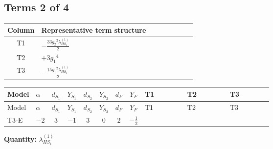 \documentclass[8pt]{article}
\begin{document}
\begin{landscape}
\subsection*{Terms 2 of 4}
\begin{center}
\begin{tabular}{@{}c >{\raggedright\arraybackslash}p{0.82\linewidth}@{}}
\toprule
Column & Representative term structure \\
\midrule
T1 & \(\displaystyle -\frac{33 {g_2}^2 {\lambda_{HS_1}^{(1)}}}{2}\) \\
\midrule
T2 & \(\displaystyle +3 {g_1}^4\) \\
\midrule
T3 & \(\displaystyle -\frac{15 {g_1}^2 {\lambda_{HS_1}^{(1)}}}{2}\) \\
\midrule
\bottomrule
\end{tabular}
\end{center}
\smallskip
\tiny
\begin{longtable}{@{}llcccccc >{\raggedright\arraybackslash}p{0.21\linewidth} >{\raggedright\arraybackslash}p{0.21\linewidth} >{\raggedright\arraybackslash}p{0.21\linewidth}@{}}
\toprule
Model & $\alpha$ & $d_{S_1}$ & $Y_{S_1}$ & $d_{S_2}$ & $Y_{S_2}$ & $d_F$ & $Y_F$ & T1 & T2 & T3 \\
\midrule
\endfirsthead
\toprule
Model & $\alpha$ & $d_{S_1}$ & $Y_{S_1}$ & $d_{S_2}$ & $Y_{S_2}$ & $d_F$ & $Y_F$ & T1 & T2 & T3 \\
\midrule
\endhead
T3-E & $-2$ & $3$ & $-1$ & $3$ & $0$ & $2$ & $-\frac{1}{2}$ & \scriptsize\adjustbox{max width=\linewidth}{$\begin{gathered} -\frac{33 {g_2}^2 {\lambda_{HS_1}^{(1)}}}{2}\end{gathered}$} & \scriptsize\adjustbox{max width=\linewidth}{$\begin{gathered} +3 {g_1}^4\end{gathered}$} & \scriptsize\adjustbox{max width=\linewidth}{$\begin{gathered} -\frac{15 {g_1}^2 {\lambda_{HS_1}^{(1)}}}{2}\end{gathered}$} \\
\midrule
\bottomrule
\end{longtable}
\clearpage
\noindent\textbf{Quantity: }$\lambda_{HS_1}^{(1)}$\par\smallskip

\end{landscape}
\end{document}
